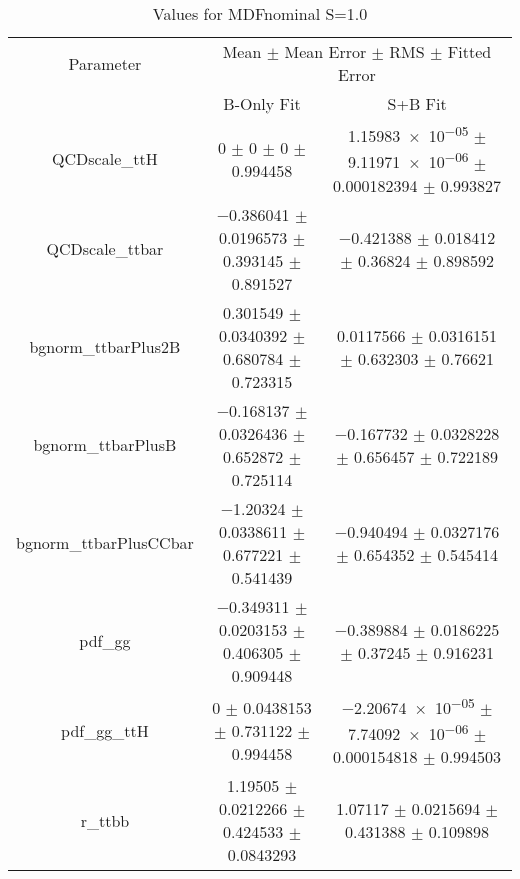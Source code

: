 \begin{table}
\centering
\caption{Values for MDFnominal S=1.0}
\begin{tabular}{ccc}
\toprule
Parameter & \multicolumn{2}{c}{Mean $\pm$ Mean Error $\pm$ RMS $\pm$ Fitted Error}\\
 & B-Only Fit & S+B Fit\\
\midrule
QCDscale\_ttH & \num{0} $\pm$ \num{0} $\pm$ \num{0} $\pm$ \num{0.994458} & \num{1.15983e-05} $\pm$ \num{9.11971e-06} $\pm$ \num{0.000182394} $\pm$ \num{0.993827}\\
QCDscale\_ttbar & \num{-0.386041} $\pm$ \num{0.0196573} $\pm$ \num{0.393145} $\pm$ \num{0.891527} & \num{-0.421388} $\pm$ \num{0.018412} $\pm$ \num{0.36824} $\pm$ \num{0.898592}\\
bgnorm\_ttbarPlus2B & \num{0.301549} $\pm$ \num{0.0340392} $\pm$ \num{0.680784} $\pm$ \num{0.723315} & \num{0.0117566} $\pm$ \num{0.0316151} $\pm$ \num{0.632303} $\pm$ \num{0.76621}\\
bgnorm\_ttbarPlusB & \num{-0.168137} $\pm$ \num{0.0326436} $\pm$ \num{0.652872} $\pm$ \num{0.725114} & \num{-0.167732} $\pm$ \num{0.0328228} $\pm$ \num{0.656457} $\pm$ \num{0.722189}\\
bgnorm\_ttbarPlusCCbar & \num{-1.20324} $\pm$ \num{0.0338611} $\pm$ \num{0.677221} $\pm$ \num{0.541439} & \num{-0.940494} $\pm$ \num{0.0327176} $\pm$ \num{0.654352} $\pm$ \num{0.545414}\\
pdf\_gg & \num{-0.349311} $\pm$ \num{0.0203153} $\pm$ \num{0.406305} $\pm$ \num{0.909448} & \num{-0.389884} $\pm$ \num{0.0186225} $\pm$ \num{0.37245} $\pm$ \num{0.916231}\\
pdf\_gg\_ttH & \num{0} $\pm$ \num{0.0438153} $\pm$ \num{0.731122} $\pm$ \num{0.994458} & \num{-2.20674e-05} $\pm$ \num{7.74092e-06} $\pm$ \num{0.000154818} $\pm$ \num{0.994503}\\
r\_ttbb & \num{1.19505} $\pm$ \num{0.0212266} $\pm$ \num{0.424533} $\pm$ \num{0.0843293} & \num{1.07117} $\pm$ \num{0.0215694} $\pm$ \num{0.431388} $\pm$ \num{0.109898}\\
\bottomrule
\end{tabular}
\end{table}